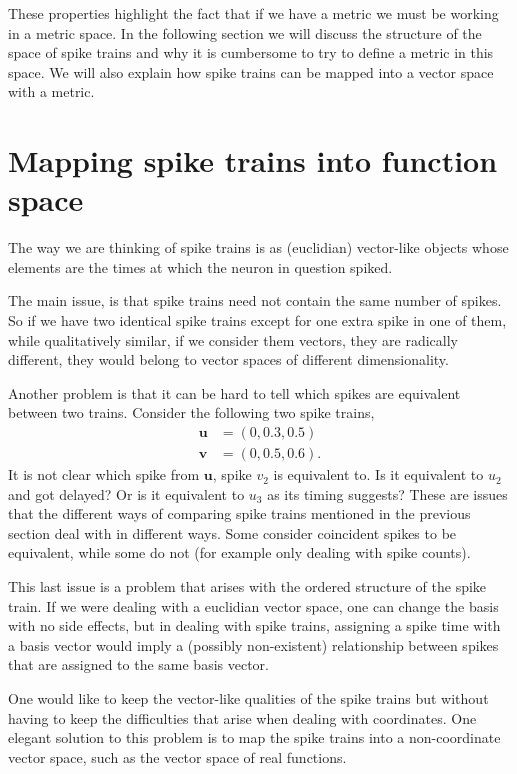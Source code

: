 \documentclass[10pt,a4paper]{book}
\begin{document}
These properties highlight the fact that if we have a metric we must be working in a metric space. In the following section we will discuss the structure of the space of spike trains and why it is cumbersome to try to define a metric in this space. We will also explain how spike trains can be mapped into a vector space with a metric.

\section{Mapping spike trains into function space}

The way we are thinking of spike trains is as (euclidian) vector-like objects whose elements are the times at which the neuron in question spiked.

The main issue, is that spike trains need not contain the same number of spikes. So if we have two identical spike trains except for one extra spike in one of them, while qualitatively similar, if we consider them vectors, they are radically different, they would belong to vector spaces of different dimensionality.

Another problem is that it can be hard to tell which spikes are equivalent between two trains. Consider the following two spike trains,
\begin{align}
\mathbf{u} &= (0, 0.3, 0.5) \nonumber \\
\mathbf{v} &= (0, 0.5, 0.6).
\end{align}
It is not clear which spike from $\mathbf{u}$, spike $v_2$ is equivalent to. Is it equivalent to $u_2$ and got delayed? Or is it equivalent to $u_3$ as its timing suggests? These are issues that the different ways of comparing spike trains mentioned in the previous section deal with in different ways. Some consider coincident spikes to be equivalent, while some do not (for example only dealing with spike counts).

This last issue is a problem that arises with the ordered structure of the spike train. If we were dealing with a euclidian vector space, one can change the basis with no side effects, but in dealing with spike trains, assigning a spike time with a basis vector would imply a (possibly non-existent) relationship between spikes that are assigned to the same basis vector.

One would like to keep the vector-like qualities of the spike trains but without having to keep the difficulties that arise when dealing with coordinates. One elegant solution to this problem is to map the spike trains into a non-coordinate vector space, such as the vector space of real functions.
\end{document}
